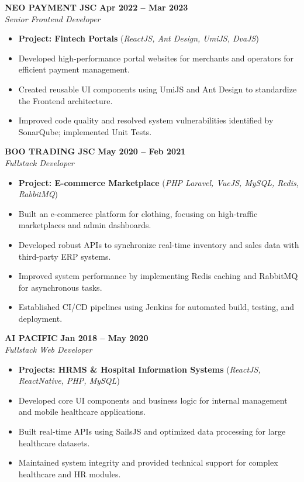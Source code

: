 \documentclass[11pt,a4paper]{article}
\begin{document}
\vspace{8pt}

\noindent \textbf{NEO PAYMENT JSC} \hfill \textbf{Apr 2022 -- Mar 2023} \\
\textit{Senior Frontend Developer}
\begin{itemize}
    \item \textbf{Project: Fintech Portals} (\textit{ReactJS, Ant Design, UmiJS, DvaJS})
    \item Developed high-performance portal websites for merchants and operators for efficient payment management.
    \item Created reusable UI components using UmiJS and Ant Design to standardize the Frontend architecture.
    \item Improved code quality and resolved system vulnerabilities identified by SonarQube; implemented Unit Tests.
\end{itemize}

\vspace{8pt}

\noindent \textbf{BOO TRADING JSC} \hfill \textbf{May 2020 -- Feb 2021} \\
\textit{Fullstack Developer}
\begin{itemize}
    \item \textbf{Project: E-commerce Marketplace} (\textit{PHP Laravel, VueJS, MySQL, Redis, RabbitMQ})
    \item Built an e-commerce platform for clothing, focusing on high-traffic marketplaces and admin dashboards.
    \item Developed robust APIs to synchronize real-time inventory and sales data with third-party ERP systems.
    \item Improved system performance by implementing Redis caching and RabbitMQ for asynchronous tasks.
    \item Established CI/CD pipelines using Jenkins for automated build, testing, and deployment.
\end{itemize}

\vspace{8pt}

\noindent \textbf{AI PACIFIC} \hfill \textbf{Jan 2018 -- May 2020} \\
\textit{Fullstack Web Developer}
\begin{itemize}
    \item \textbf{Projects: HRMS \& Hospital Information Systems} (\textit{ReactJS, ReactNative, PHP, MySQL})
    \item Developed core UI components and business logic for internal management and mobile healthcare applications.
    \item Built real-time APIs using SailsJS and optimized data processing for large healthcare datasets.
    \item Maintained system integrity and provided technical support for complex healthcare and HR modules.
\end{itemize}
\end{document}
